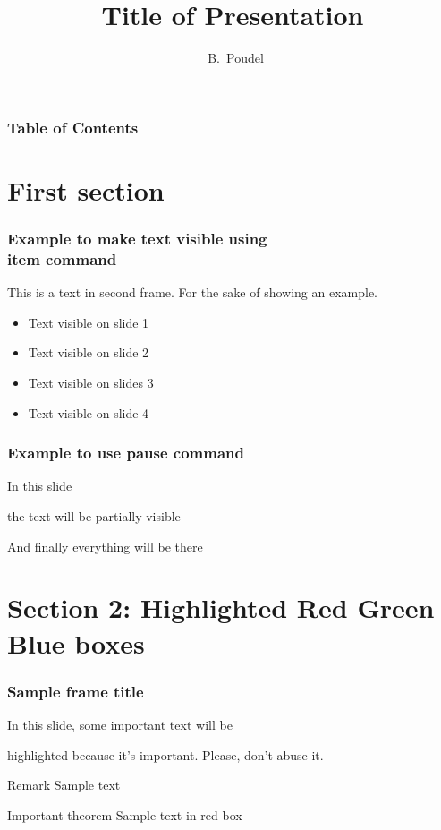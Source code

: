 \documentclass{beamer}
\title[Astroseminar Fall 2017] %
{Title of  Presentation}
\author[Poudel, Bhishan] %
{~B.~Poudel\inst{1} }
\institute[Ohio University] %
{\inst{1}%
  Department of Physics and Astronomy\\
  Ohio University
}
\date[Aug 21, 2017] %
{} %
\begin{document}
\frame{\titlepage}
\begin{frame}
\frametitle{Table of Contents}
\tableofcontents
\end{frame}


\section{First section}
\begin{frame}
  \frametitle{Example to make text visible using \\item command}
    This is a text in second frame. For the sake of showing an example.

  \begin{itemize}
    \item<1-> Text visible on slide 1
    \item<2-> Text visible on slide 2
    \item<3> Text visible on slides 3
    \item<4-> Text visible on slide 4
  \end{itemize}
\end{frame}


\begin{frame}
  \frametitle{Example to use pause command}
    In this slide \pause

    the text will be partially visible \pause

    And finally everything will be there
\end{frame}


%
%
%
%
\section{Section 2: Highlighted Red Green Blue boxes}\label{sec:sec2}
\begin{frame}
\frametitle{Sample frame title}
  In this slide, some important text will be

  \alert{highlighted} because it's important.
    Please, don't abuse it.

  \begin{block}{Remark}
    Sample text
  \end{block}

  \begin{alertblock}{Important theorem}
    Sample text in red box
  \end{alertblock}
\end{frame}
\end{document}
